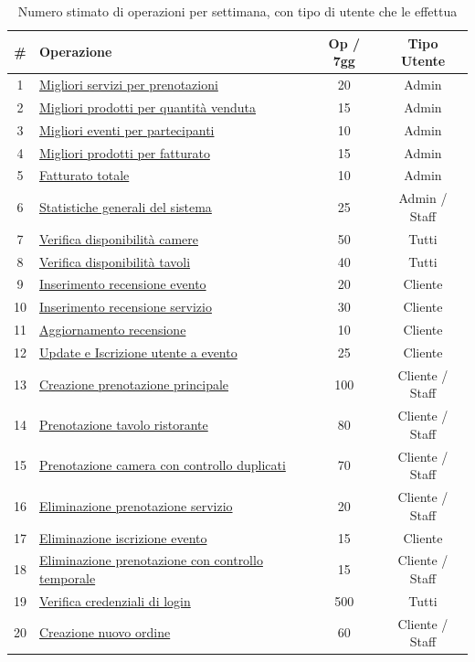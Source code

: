 \documentclass[a4paper,12pt]{report}
\begin{document}
\begin{table}[H]
  \centering
  \small
  \renewcommand{\arraystretch}{1.12}
  \begin{tabularx}{\textwidth}{|c|>{\raggedright\arraybackslash}X|c|c|}
    \hline
    \rowcolor{gray!20}
    \textbf{\#} & \textbf{Operazione} & \textbf{Op / 7gg} &
    \textbf{Tipo Utente} \\
    \hline
    1 & \hyperref[op1]{Migliori servizi per prenotazioni} & 20 & Admin \\
    \hline
    2 & \hyperref[op2]{Migliori prodotti per quantità venduta} & 15 & Admin \\
    \hline
    3 & \hyperref[op3]{Migliori eventi per partecipanti} & 10 & Admin \\
    \hline
    4 & \hyperref[op4]{Migliori prodotti per fatturato} & 15 & Admin \\
    \hline
    5 & \hyperref[op5]{Fatturato totale} & 10 & Admin \\
    \hline
    6 & \hyperref[op6]{Statistiche generali del sistema} &
    25 & Admin / Staff \\
    \hline
    7 & \hyperref[op7]{Verifica disponibilità camere} & 50 & Tutti \\
    \hline
    8 & \hyperref[op8]{Verifica disponibilità tavoli} & 40 & Tutti \\
    \hline
    9 & \hyperref[op9]{Inserimento recensione evento} & 20
    & Cliente \\
    \hline
    10 & \hyperref[op10]{Inserimento recensione servizio} &
    30 & Cliente \\
    \hline
    11 & \hyperref[op11]{Aggiornamento recensione} & 10 & Cliente \\
    \hline
    12 & \hyperref[op12]{Update e Iscrizione utente a evento} &
    25 & Cliente \\
    \hline
    13 & \hyperref[op13]{Creazione prenotazione principale} & 100 &
    Cliente / Staff \\
    \hline
    14 & \hyperref[op14]{Prenotazione tavolo ristorante} & 80 &
    Cliente / Staff \\
    \hline
    15 & \hyperref[op15]{Prenotazione camera con controllo duplicati}
    & 70 & Cliente / Staff \\
    \hline
    16 & \hyperref[op16]{Eliminazione prenotazione servizio} & 20 &
    Cliente / Staff \\
    \hline
    17 & \hyperref[op17]{Eliminazione iscrizione evento} &
    15 & Cliente \\
    \hline
    18 & \hyperref[op18]{Eliminazione prenotazione con controllo
    temporale} & 15 & Cliente / Staff \\
    \hline
    19 & \hyperref[op19]{Verifica credenziali di login} &
    500 & Tutti \\
    \hline
    20 & \hyperref[op20]{Creazione nuovo ordine} & 60 &
    Cliente / Staff \\
    \hline
  \end{tabularx}
  \caption{Numero stimato di operazioni per settimana, con tipo di
  utente che le effettua}
  \label{tab:operazioni-settimanali}
\end{table}
\end{document}
